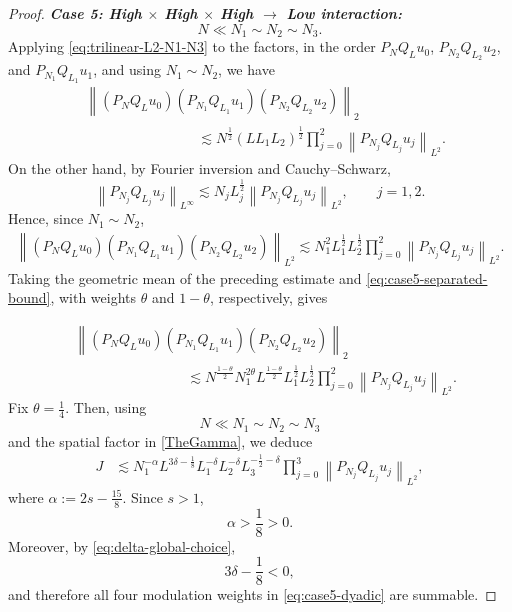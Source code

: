 \documentclass[12pt,oneside,reqno]{amsart}
\numberwithin{equation}{section}
\theoremstyle{plain}
\newcommand{\norm}[1]{%
    \left\lVert #1\right\rVert%
}
\newcommand{\Lpn}[2]{%
    \left\lVert #1\right\rVert_{L^{#2}}%
}
\begin{document}
\begin{proof}
\noindent
\textbf{\emph{Case 5: High $\times$ High $\times$ High $\to$ Low interaction:}}
\begin{equation}
    N\ll N_1\sim N_2\sim N_3.
\end{equation}
Applying \eqref{eq:trilinear-L2-N1-N3} to the factors,
in the order $P_NQ_Lu_0$, $P_{N_2}Q_{L_2}u_2$, and
$P_{N_1}Q_{L_1}u_1$, and using $N_1 \sim N_2$, we have
\begin{equation}
\label{eq:case5-separated-bound}
\begin{aligned}
&
\left\|
    (P_NQ_Lu_0)
    (P_{N_1}Q_{L_1}u_1)
    (P_{N_2}Q_{L_2}u_2)
\right\|_2
\\
&\qquad\qquad \qquad \qquad \lesssim
N^{\frac12}
(LL_1L_2)^{\frac12}
\prod_{j=0}^2
\Lpn{P_{N_j}Q_{L_j}u_j}{2}.
\end{aligned}
\end{equation}
On the other hand, by Fourier inversion and Cauchy--Schwarz,
\begin{equation}
    \norm{P_{N_j}Q_{L_j}u_j}_{L^\infty}
    \lesssim
    N_jL_j^{\frac12}
    \norm{P_{N_j}Q_{L_j}u_j}_{L^2},
    \qquad j=1,2.
\end{equation}
Hence, since $N_1\sim N_2$,
\begin{equation}
\begin{aligned}
\norm{
    (P_NQ_Lu_0)
    (P_{N_1}Q_{L_1}u_1)
    (P_{N_2}Q_{L_2}u_2)
}_{L^2}
\lesssim
N_1^2L_1^{\frac12}L_2^{\frac12}
\prod_{j=0}^2
\norm{P_{N_j}Q_{L_j}u_j}_{L^2}.
\end{aligned}
\end{equation}
Taking the geometric mean of the preceding estimate and
\eqref{eq:case5-separated-bound}, with weights $\theta$ and
$1-\theta$, respectively, gives

\begin{equation}
\label{eq:case5-interpolated}
\begin{aligned}
&
\left\|
    (P_NQ_Lu_0)
    (P_{N_1}Q_{L_1}u_1)
    (P_{N_2}Q_{L_2}u_2)
\right\|_2
\\
&\qquad\qquad \qquad \qquad \lesssim
N^{\frac{1-\theta}{2}}
N_1^{2\theta}
L^{\frac{1-\theta}{2}}
L_1^{\frac12}
L_2^{\frac12}
\prod_{j=0}^2
\Lpn{P_{N_j}Q_{L_j}u_j}{2}.
\end{aligned}
\end{equation}
Fix $\theta=\frac14$. Then, using
\begin{equation}
    N\ll N_1\sim N_2\sim N_3
\end{equation}
and the spatial factor in \eqref{TheGamma}, we deduce
\begin{align}
J
&\lesssim
N_1^{-\alpha}
L^{3\delta-\frac18}
L_1^{-\delta}
L_2^{-\delta}
L_3^{-\frac12-\delta}
\prod_{j=0}^3
\Lpn{P_{N_j}Q_{L_j}u_j}{2},
\label{eq:case5-dyadic}
\end{align}
where $ \alpha:=2s-\frac{15}{8}$. Since $s>1$,
\begin{equation}
    \alpha>\frac18>0.
\end{equation}
Moreover, by \eqref{eq:delta-global-choice},
\begin{equation}
    3\delta-\frac18<0,
\end{equation}
and therefore all four modulation weights in
\eqref{eq:case5-dyadic} are summable.


\end{proof}
\end{document}
